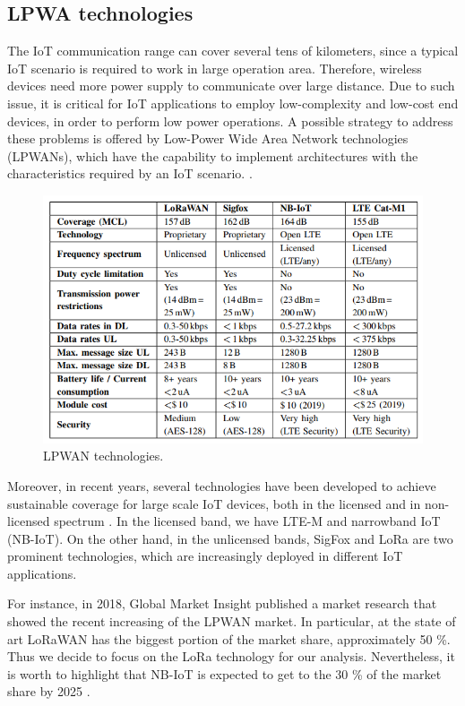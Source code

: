 \documentclass[10pt, a4paper, twocolumn]{article}
\theoremstyle{definition}
\begin{document}
\subsection{LPWA technologies}
The IoT communication range can cover several tens of kilometers, since a typical IoT scenario is required to work in large operation area. %
Therefore, wireless devices need more power supply to communicate over large distance. Due to such issue, it is critical for IoT applications to employ low-complexity and low-cost end devices, in order to perform low power operations. A possible strategy to address these problems is offered by Low-Power Wide Area Network technologies (LPWANs), which have the capability to implement architectures with the characteristics required by an IoT scenario. \cite{Lora_IoT}.
\\
\begin{figure}
    \centering
    \includegraphics[scale = 0.7]{images/Characteristics.PNG}
    \caption{LPWAN technologies.}
    \label{fig:technologies}
\end{figure}
Moreover, in recent years, several technologies have been developed to achieve sustainable coverage for large scale IoT devices, both in the licensed and in non-licensed spectrum \cite{experimental_evaluation}.
In the licensed band, we have LTE-M and narrowband IoT (NB-IoT). On the other hand, in the unlicensed bands, SigFox and LoRa are two prominent technologies, which are increasingly deployed in different IoT applications.
\par
For instance, in 2018, Global Market Insight published a market research that showed the recent increasing of the LPWAN market. In particular, at the state of art LoRaWAN has the biggest portion of the market share, approximately 50 \%. Thus we decide to focus on the LoRa technology for our analysis. Nevertheless, it is worth to highlight that NB-IoT is expected to get to the 30 \% of the market share by 2025 \cite{market}. 
\end{document}
